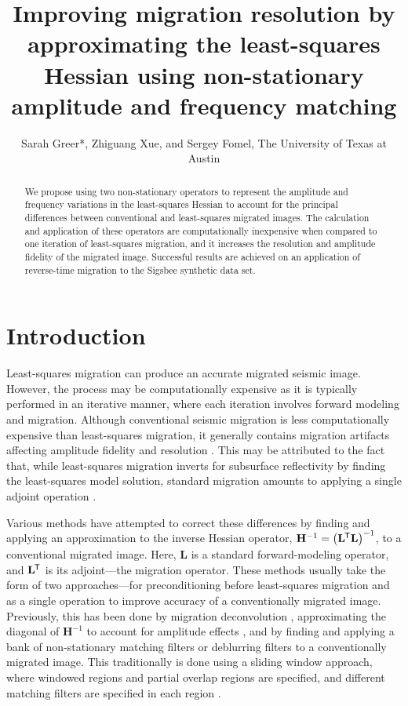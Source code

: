 \title{Improving migration resolution by approximating the least-squares Hessian using non-stationary amplitude and frequency matching}
\author{Sarah Greer*, Zhiguang Xue, and Sergey Fomel, The University of Texas at Austin}
\newcommand*{\tran}{^{\mkern-1.5mu\mathsf{T}}}
\maketitle
{}
\begin{abstract}
    We propose using two non-stationary operators to represent the amplitude and frequency variations in the least-squares Hessian to account for the principal differences between conventional and least-squares migrated images.
    The calculation and application of these operators are computationally inexpensive when compared to one iteration of least-squares migration, and it increases the resolution and amplitude fidelity of the migrated image.
    Successful results are achieved on an application of reverse-time migration to the Sigsbee synthetic data set.
\end{abstract}

\section{Introduction}
    Least-squares migration can produce an accurate migrated seismic image.
    However, the process may be computationally expensive as it is typically performed in an iterative manner, where each iteration involves forward modeling and migration. 
    Although conventional seismic migration is less computationally expensive than least-squares migration, it generally contains migration artifacts affecting amplitude fidelity and resolution \cite[]{lsamp,pwlsrtm}.
    This may be attributed to the fact that, while least-squares migration inverts for subsurface reflectivity by finding the least-squares model solution, standard migration amounts to applying a single adjoint operation \cite[]{pvi}. 

    Various methods have attempted to correct these differences by finding and applying an approximation to the inverse Hessian operator, $\mathbf{H}^{-1} = \left (\mathbf{L}\tran\mathbf{L} \right )^{-1}$, to a conventional migrated image.
    Here, $\mathbf{L}$ is a standard forward-modeling operator, and $\mathbf{L}\tran$ is its adjoint---the migration operator.
    These methods usually take the form of two approaches---for preconditioning before least-squares migration and as a single operation to improve accuracy of a conventionally migrated image.
    Previously, this has been done by migration deconvolution \cite[]{poststack,prestack}, approximating the diagonal of $\mathbf{H}^{-1}$ to account for amplitude effects \cite[]{amp,diagamp}, and by finding and applying a bank of non-stationary matching filters \cite[]{imop,rtmmf} or deblurring filters \cite[]{debfilt} to a conventionally migrated image.
    This traditionally is done using a sliding window approach, where windowed regions and partial overlap regions are specified, and different matching filters are specified in each region \cite[]{seiinv}.


